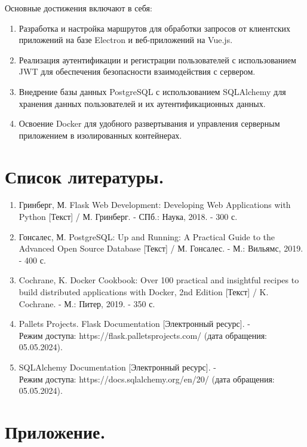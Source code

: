 \documentclass[12pt, russian]{extarticle}
\begin{document}
\begin{spacing}{1.5}
    Основные достижения включают в себя:

    \begin{enumerate}
        \item Разработка и настройка маршрутов для обработки запросов от клиентских приложений
            на базе Electron и веб-приложений на Vue.js.
        \item Реализация аутентификации и регистрации пользователей с использованием JWT
            для обеспечения безопасности взаимодействия с сервером.
        \item Внедрение базы данных PostgreSQL с использованием SQLAlchemy для хранения
            данных пользователей и их аутентификационных данных.
        \item Освоение Docker для удобного развертывания и управления серверным приложением
            в изолированных контейнерах.
    \end{enumerate}

    \newpage
    \section{Список литературы.}

    \begin{enumerate}
        \item Гринберг, М. Flask Web Development: Developing Web Applications with Python [Текст] / М. Гринберг. - СПб.: Наука, 2018. - 300 с.
        \item Гонсалес, М. PostgreSQL: Up and Running: A Practical Guide to the Advanced Open Source Database [Текст] / М. Гонсалес. - М.: Вильямс, 2019. - 400 с.
        \item Cochrane, K. Docker Cookbook: Over 100 practical and insightful recipes to build distributed applications with Docker, 2nd Edition [Текст] / K. Cochrane. - М.: Питер, 2019. - 350 с.
        \item Pallets Projects. Flask Documentation [Электронный ресурс]. - \\
            Режим доступа: https://flask.palletsprojects.com/ (дата обращения: 05.05.2024).
        \item SQLAlchemy Documentation [Электронный ресурс]. - \\
            Режим доступа: https://docs.sqlalchemy.org/en/20/ (дата обращения: 05.05.2024).
    \end{enumerate}

    \newpage
    \section{Приложение.}

    \end{spacing}
\end{document}
